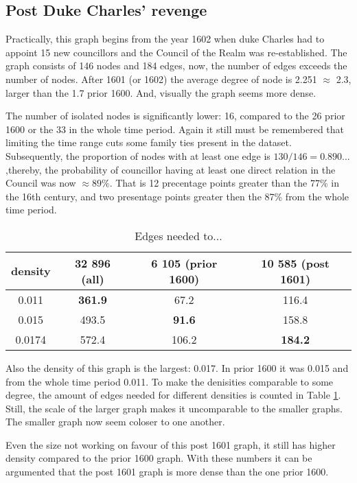 \subsection{Post Duke Charles' revenge}
Practically, this graph begins from the year 1602 when duke Charles had to appoint 15 new councillors and the Council of the Realm was re-established. The graph consists of 146 nodes and 184 edges, now, the number of edges exceeds the number of nodes. After 1601 (or 1602) the average degree of node is 2.251 $\approx$ 2.3, larger than the 1.7 prior 1600. And, visually the graph seems more dense. 

The number of isolated nodes is significantly lower: 16, compared to the 26 prior 1600 or the 33 in the whole time period. Again it still must be remembered that limiting the time range cuts some family ties present in the dataset. Subsequently, the proportion of nodes with at least one edge is $130/146=0.890...$ ,thereby, the probability of councillor having at least one direct relation in the Council was now $\approx 89\%$. That is 12 precentage points greater than the 77\% in the 16th century, and two presentage points greater then the 87\% from the whole time period.

\begin{table}
	\caption[Edges needed]{Edges needed to...}
	\label{edges}
	\begin{tabular}{cccc}
		\hline
		density & 32 896 (all) & 6 105 (prior 1600) & 10 585 (post 1601) \\
		\hline 
		0.011 & \textbf{361.9} & 67.2 & 116.4 \\
		\hline
		0.015 & 493.5 & \textbf{91.6} & 158.8 \\
		\hline
		0.0174 & 572.4 & 106.2 & \textbf{184.2}\\
		\hline
	\end{tabular}
\end{table}

Also the density of this graph is the largest: 0.017. In prior 1600 it was 0.015 and from the whole time period 0.011. To make the denisities comparable to some degree, the amount of edges needed for different densities is counted in Table \ref{edges}. Still, the scale of the larger graph makes it uncomparable to the smaller graphs. The smaller graph now seem coloser to one another.

Even the size not working on favour of this post 1601 graph, it still has higher density compared to the prior 1600 graph. With these numbers it can be argumented that the post 1601 graph is more dense than the one prior 1600. 

